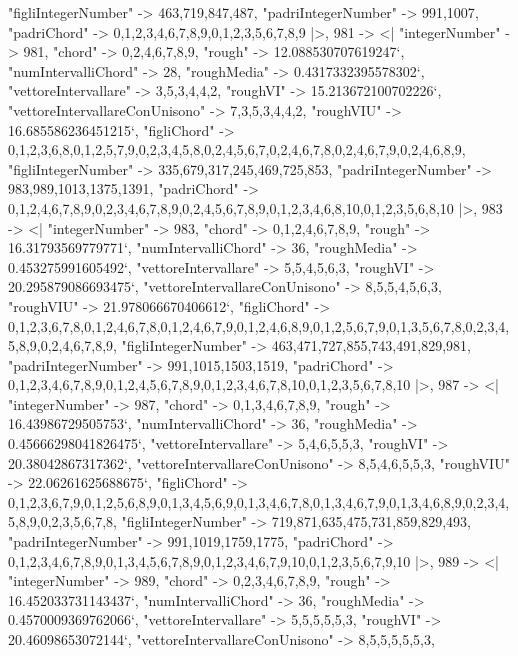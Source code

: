 \documentclass[
]{article}
\begin{document}
\begin{DatasetVerbatim}
    "figliIntegerNumber" -> {463,719,847,487},
    "padriIntegerNumber" -> {991,1007},
    "padriChord" -> {{0,1,2,3,4,6,7,8,9},{0,1,2,3,5,6,7,8,9}}
  |>,
  981 -> <|
    "integerNumber" -> 981,
    "chord" -> {0,2,4,6,7,8,9},
    "rough" -> 12.088530707619247`,
    "numIntervalliChord" -> 28,
    "roughMedia" -> 0.4317332395578302`,
    "vettoreIntervallare" -> {3,5,3,4,4,2},
    "roughVI" -> 15.213672100702226`,
    "vettoreIntervallareConUnisono" -> {7,3,5,3,4,4,2},
    "roughVIU" -> 16.685586236451215`,
    "figliChord" -> {{0,1,2,3,6,8},{0,1,2,5,7,9},{0,2,3,4,5,8},{0,2,4,5,6,7},{0,2,4,6,7,8},{0,2,4,6,7,9},{0,2,4,6,8,9}},
    "figliIntegerNumber" -> {335,679,317,245,469,725,853},
    "padriIntegerNumber" -> {983,989,1013,1375,1391},
    "padriChord" -> {{0,1,2,4,6,7,8,9},{0,2,3,4,6,7,8,9},{0,2,4,5,6,7,8,9},{0,1,2,3,4,6,8,10},{0,1,2,3,5,6,8,10}}
  |>,
  983 -> <|
    "integerNumber" -> 983,
    "chord" -> {0,1,2,4,6,7,8,9},
    "rough" -> 16.31793569779771`,
    "numIntervalliChord" -> 36,
    "roughMedia" -> 0.453275991605492`,
    "vettoreIntervallare" -> {5,5,4,5,6,3},
    "roughVI" -> 20.295879086693475`,
    "vettoreIntervallareConUnisono" -> {8,5,5,4,5,6,3},
    "roughVIU" -> 21.978066670406612`,
    "figliChord" -> {{0,1,2,3,6,7,8},{0,1,2,4,6,7,8},{0,1,2,4,6,7,9},{0,1,2,4,6,8,9},{0,1,2,5,6,7,9},{0,1,3,5,6,7,8},{0,2,3,4,5,8,9},{0,2,4,6,7,8,9}},
    "figliIntegerNumber" -> {463,471,727,855,743,491,829,981},
    "padriIntegerNumber" -> {991,1015,1503,1519},
    "padriChord" -> {{0,1,2,3,4,6,7,8,9},{0,1,2,4,5,6,7,8,9},{0,1,2,3,4,6,7,8,10},{0,1,2,3,5,6,7,8,10}}
  |>,
  987 -> <|
    "integerNumber" -> 987,
    "chord" -> {0,1,3,4,6,7,8,9},
    "rough" -> 16.43986729505753`,
    "numIntervalliChord" -> 36,
    "roughMedia" -> 0.45666298041826475`,
    "vettoreIntervallare" -> {5,4,6,5,5,3},
    "roughVI" -> 20.38042867317362`,
    "vettoreIntervallareConUnisono" -> {8,5,4,6,5,5,3},
    "roughVIU" -> 22.06261625688675`,
    "figliChord" -> {{0,1,2,3,6,7,9},{0,1,2,5,6,8,9},{0,1,3,4,5,6,9},{0,1,3,4,6,7,8},{0,1,3,4,6,7,9},{0,1,3,4,6,8,9},{0,2,3,4,5,8,9},{0,2,3,5,6,7,8}},
    "figliIntegerNumber" -> {719,871,635,475,731,859,829,493},
    "padriIntegerNumber" -> {991,1019,1759,1775},
    "padriChord" -> {{0,1,2,3,4,6,7,8,9},{0,1,3,4,5,6,7,8,9},{0,1,2,3,4,6,7,9,10},{0,1,2,3,5,6,7,9,10}}
  |>,
  989 -> <|
    "integerNumber" -> 989,
    "chord" -> {0,2,3,4,6,7,8,9},
    "rough" -> 16.452033731143437`,
    "numIntervalliChord" -> 36,
    "roughMedia" -> 0.4570009369762066`,
    "vettoreIntervallare" -> {5,5,5,5,5,3},
    "roughVI" -> 20.46098653072144`,
    "vettoreIntervallareConUnisono" -> {8,5,5,5,5,5,3},

\end{DatasetVerbatim}
\end{document}
